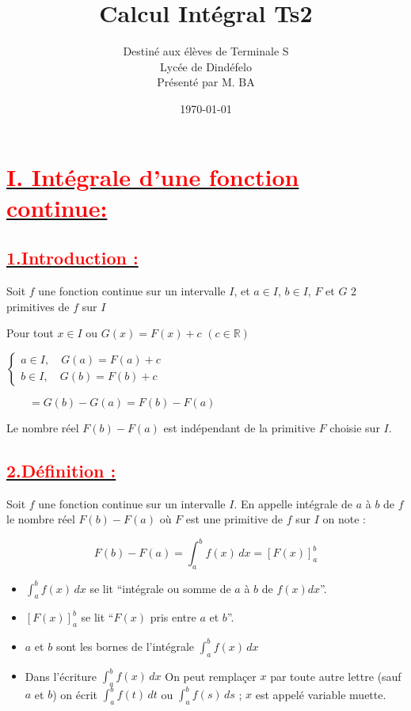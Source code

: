 \documentclass[12pt]{article}
\author{Destiné aux élèves de Terminale S\\Lycée de Dindéfelo\\Présenté par M. BA}
\title{\textbf{Calcul Intégral Ts2}}
\date{\today}
\begin{document}
\maketitle
\newpage

\section*{\underline{\textbf{\textcolor{red}{I. Intégrale d'une fonction continue: }}}}
\subsection*{\underline{\textbf{\textcolor{red}{1.Introduction :}}}}

Soit \( f \) une fonction continue sur un intervalle \( I \), et \( a \in I \), \( b \in I \), \( F \) et \( G \) 2 primitives de \( f \) sur \( I \)

Pour tout \( x \in I \) ou \( G(x) = F(x) + c \) \( (c\in \mathbb{R}) \)

\underline{\( 
\begin{cases}
a \in I,\quad  G(a) = F(a) + c\\
b \in I,\quad G(b) = F(b) + c
\end{cases}
\)}

\(
\quad\quad=G(b) - G(a) = F(b) - F(a)
\)

Le nombre réel \( F(b) - F(a) \) est indépendant de la primitive \( F \) choisie sur \( I \).

\subsection*{\underline{\textbf{\textcolor{red}{2.Définition :}}}}

Soit \( f \) une fonction continue sur un intervalle \( I \).
En appelle intégrale de \( a \) à \( b \) de \( f \) le nombre réel \( F(b) - F(a) \) où \( F \) est une primitive de \( f \) sur \( I \) on note :

\[
F(b) - F(a) = \int_{a}^{b} f(x) \, dx = \left[ F(x) \right]_{a}^{b}
\]

\begin{itemize}
    \item \( \int_a^b f(x) \, dx \) se lit ``intégrale ou somme  de $a$ à $b$ de $f(x)dx$''.
    \item \( \left[ F(x) \right]_a^b \) se lit ``\( F(x) \) pris entre \( a \) et \( b \)''.
    \item \( a \) et \( b \) sont les bornes de l'intégrale \( \int_a^b f(x) \, dx \)
        \item Dans l'écriture \( \int_a^b f(x) \, dx \) On peut remplaçer \( x \) par toute autre lettre (sauf \( a \) et \( b \)) on écrit \( \int_a^b f(t) \, dt \) ou \( \int_a^b f(s) \, ds \) ; \( x \) est appelé variable muette.
\end{itemize}
\newpage
\end{document}
